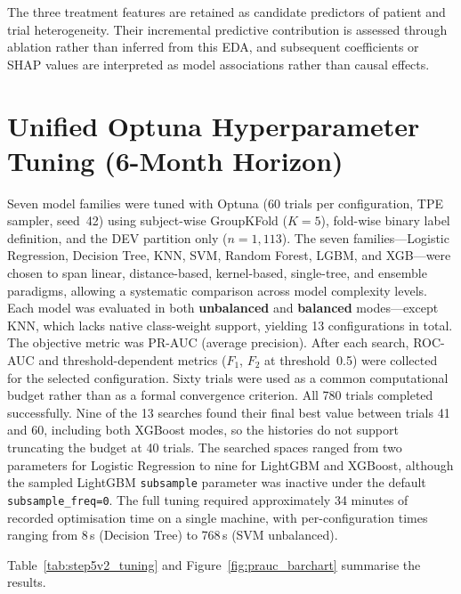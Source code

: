 The three treatment features are retained as candidate predictors of patient and trial heterogeneity. Their incremental predictive contribution is assessed through ablation rather than inferred from this EDA, and subsequent coefficients or \gls{SHAP} values are interpreted as model associations rather than causal effects.


\section{Unified Optuna Hyperparameter Tuning (6-Month Horizon)}
\label{sec:results_optuna_v2}

Seven model families were tuned with Optuna (60 trials per configuration, \gls{TPE} sampler, seed~42) using subject-wise GroupKFold ($K\!=\!5$), fold-wise binary label definition, and the \gls{DEV} partition only ($n\!=\!1{,}113$).
The seven families---Logistic Regression, Decision Tree, \gls{KNN}, \gls{SVM}, Random Forest, \gls{LGBM}, and \gls{XGB}---were chosen to span linear, distance-based, kernel-based, single-tree, and ensemble paradigms, allowing a systematic comparison across model complexity levels.
Each model was evaluated in both \textbf{unbalanced} and \textbf{balanced} modes---except \gls{KNN}, which lacks native class-weight support, yielding 13 configurations in total.
The objective metric was \gls{PR-AUC} (average precision). After each search, \gls{ROC-AUC} and threshold-dependent metrics ($F_1$, $F_2$ at threshold~0.5) were collected for the selected configuration.
Sixty trials were used as a common computational budget rather than as a formal convergence criterion. All 780 trials completed successfully. Nine of the 13 searches found their final best value between trials 41 and 60, including both XGBoost modes, so the histories do not support truncating the budget at 40 trials. The searched spaces ranged from two parameters for Logistic Regression to nine for LightGBM and XGBoost, although the sampled LightGBM \texttt{subsample} parameter was inactive under the default \texttt{subsample\_freq=0}.
The full tuning required approximately 34 minutes of recorded optimisation time on a single machine, with per-configuration times ranging from 8\,s (Decision Tree) to 768\,s (\gls{SVM} unbalanced).

Table~\ref{tab:step5v2_tuning} and Figure~\ref{fig:prauc_barchart} summarise the results.




